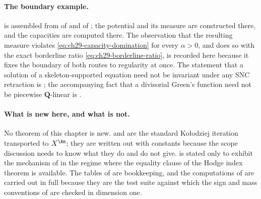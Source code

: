 \paragraph{The boundary example.}
 is assembled from
 of  and
 of ; the
potential and its measure are constructed there, and the capacities are
computed there.  The observation that the resulting measure violates
\eqref{eq:ch29-capacity-domination} for every \(\alpha>0\), and does so with
the exact borderline ratio \eqref{eq:ch29-borderline-ratio}, is recorded
here because it fixes the boundary of both routes to regularity at once.
The statement that a solution of a skeleton-supported equation need not be
invariant under any SNC retraction is
\cite[Theorem~B]{BJGreen24}; the accompanying fact that a divisorial
Green's function need not be piecewise \(\mathbf Q\)-linear is
\cite[Theorem~A]{BJGreen24}.

\paragraph{What is new here, and what is not.}
No theorem of this chapter is new.   and
 are the standard Ko\l odziej iteration
transported to \(X^{\An}\); they are written out with constants because the
scope discussion needs to know what they do and do not give.
 is stated only to exhibit the mechanism
of  in the regime where the equality clause of
the Hodge index theorem is available.  The tables of
 are bookkeeping, and the
computations of  are carried out in full because they
are the test suite against which the sign and mass conventions of
 are checked in dimension one.

